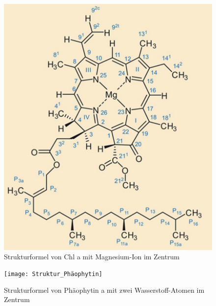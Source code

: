 \documentclass[10pt,a4paper]{article}
\begin{document}
			
			\begin{figure}[H]
				\centering
				\includegraphics[scale=0.4]{Struktur_Chlorophyll}
				\caption{Strukturformel von Chl a mit Magnesium-Ion im Zentrum\cite{Chlorophyllestruktur}}
				\label{fig:chlorophyllestruktur}
			\end{figure}
			
			
			\begin{figure}[H]
				\centering
				\texttt{[image: Struktur\_Phäophytin]}
				\caption{Strukturformel von Phäophytin a mit zwei Wasserstoff-Atomen im Zentrum\cite{Phäophytin}}
				\label{fig:Phyäophytinstruktur}
			\end{figure}
			
\end{document}
